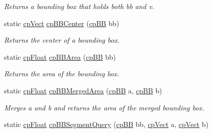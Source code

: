 \begin{DoxyCompactItemize}
\begin{DoxyCompactList}\small\item\em Returns a bounding box that holds both {\ttfamily bb} and {\ttfamily v}. \end{DoxyCompactList}\item 
\hypertarget{group__cp_b_b_b_ga341e84758fe8fd212e6af09385ecece6}{}static \hyperlink{structcp_vect}{cp\+Vect} \hyperlink{group__cp_b_b_b_ga341e84758fe8fd212e6af09385ecece6}{cp\+B\+B\+Center} (\hyperlink{structcp_b_b}{cp\+B\+B} bb)\label{group__cp_b_b_b_ga341e84758fe8fd212e6af09385ecece6}

\begin{DoxyCompactList}\small\item\em Returns the center of a bounding box. \end{DoxyCompactList}\item 
\hypertarget{group__cp_b_b_b_gadc31eb18f01b1200938b21ed7e35257a}{}static \hyperlink{group__basic_types_gac1ed65573e035bf892505768c852d8d3}{cp\+Float} \hyperlink{group__cp_b_b_b_gadc31eb18f01b1200938b21ed7e35257a}{cp\+B\+B\+Area} (\hyperlink{structcp_b_b}{cp\+B\+B} bb)\label{group__cp_b_b_b_gadc31eb18f01b1200938b21ed7e35257a}

\begin{DoxyCompactList}\small\item\em Returns the area of the bounding box. \end{DoxyCompactList}\item 
\hypertarget{group__cp_b_b_b_ga89f37acb475dd1dc1b6571282033c0f0}{}static \hyperlink{group__basic_types_gac1ed65573e035bf892505768c852d8d3}{cp\+Float} \hyperlink{group__cp_b_b_b_ga89f37acb475dd1dc1b6571282033c0f0}{cp\+B\+B\+Merged\+Area} (\hyperlink{structcp_b_b}{cp\+B\+B} a, \hyperlink{structcp_b_b}{cp\+B\+B} b)\label{group__cp_b_b_b_ga89f37acb475dd1dc1b6571282033c0f0}

\begin{DoxyCompactList}\small\item\em Merges {\ttfamily a} and {\ttfamily b} and returns the area of the merged bounding box. \end{DoxyCompactList}\item 
\hypertarget{group__cp_b_b_b_gaf623a5ee2e14df8c002fd742b08686d1}{}static \hyperlink{group__basic_types_gac1ed65573e035bf892505768c852d8d3}{cp\+Float} \hyperlink{group__cp_b_b_b_gaf623a5ee2e14df8c002fd742b08686d1}{cp\+B\+B\+Segment\+Query} (\hyperlink{structcp_b_b}{cp\+B\+B} bb, \hyperlink{structcp_vect}{cp\+Vect} a, \hyperlink{structcp_vect}{cp\+Vect} b)\label{group__cp_b_b_b_gaf623a5ee2e14df8c002fd742b08686d1}


\end{DoxyCompactItemize}
